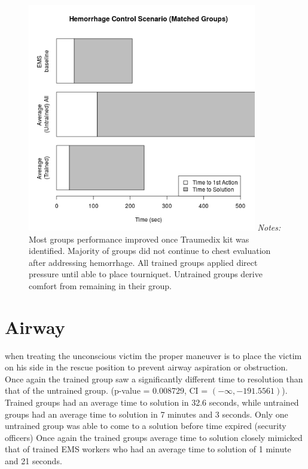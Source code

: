 \documentclass{article}
\begin{document}
\begin{figure}[hp]
\centering
\begin{minipage}{.7\linewidth}
\includegraphics[width = 10cm]{Arterial_Plot.png}
\footnotesize
\emph{Notes:} Most groups performance improved once Traumedix kit was identified.
Majority of groups did not continue to chest evaluation after addressing hemorrhage.
All trained groups applied direct pressure until able to place tourniquet.
Untrained groups derive comfort from remaining in their group.
\end{minipage}
\end{figure}

\section{Airway}
when treating the unconscious victim the proper maneuver is to place the victim on his side in the 
rescue position to prevent airway aspiration or obstruction. Once again the trained group saw a significantly 
different time to resolution than that of the untrained group. (p-value = 0.008729, CI = $(-\infty, -191.5561)$). Trained groups had an 
average time to solution in 32.6 seconds, while untrained groups had an average time to solution in 7 minutes 
and 3 seconds. Only one untrained group was able to come to a solution before time expired (security officers) 
Once again the trained groups average time to solution closely mimicked that of trained EMS workers who had 
an average time to solution of 1 minute and 21 seconds.
\end{document}
